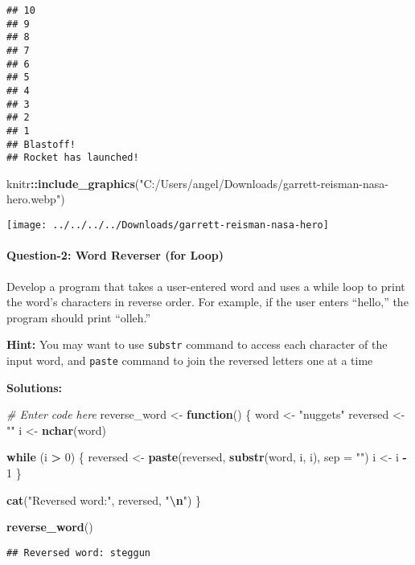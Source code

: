 \documentclass[
]{article}
\newenvironment{Shaded}{\begin{snugshade}}{\end{snugshade}}
\newcommand{\AttributeTok}[1]{\textcolor[rgb]{0.13,0.29,0.53}{#1}}
\newcommand{\CommentTok}[1]{\textcolor[rgb]{0.56,0.35,0.01}{\textit{#1}}}
\newcommand{\ControlFlowTok}[1]{\textcolor[rgb]{0.13,0.29,0.53}{\textbf{#1}}}
\newcommand{\DecValTok}[1]{\textcolor[rgb]{0.00,0.00,0.81}{#1}}
\newcommand{\FunctionTok}[1]{\textcolor[rgb]{0.13,0.29,0.53}{\textbf{#1}}}
\newcommand{\NormalTok}[1]{#1}
\newcommand{\OtherTok}[1]{\textcolor[rgb]{0.56,0.35,0.01}{#1}}
\newcommand{\SpecialCharTok}[1]{\textcolor[rgb]{0.81,0.36,0.00}{\textbf{#1}}}
\newcommand{\StringTok}[1]{\textcolor[rgb]{0.31,0.60,0.02}{#1}}
\begin{document}
\begin{verbatim}
## 10 
## 9 
## 8 
## 7 
## 6 
## 5 
## 4 
## 3 
## 2 
## 1 
## Blastoff!
## Rocket has launched!
\end{verbatim}

\begin{Shaded}
\begin{Highlighting}[]
\NormalTok{knitr}\SpecialCharTok{::}\FunctionTok{include\_graphics}\NormalTok{(}\StringTok{"C:/Users/angel/Downloads/garrett{-}reisman{-}nasa{-}hero.webp"}\NormalTok{)}
\end{Highlighting}
\end{Shaded}

\texttt{[image: ../../../../Downloads/garrett-reisman-nasa-hero]}

\hypertarget{question-2-word-reverser-for-loop}{%
\paragraph{Question-2: Word Reverser (for
Loop)}\label{question-2-word-reverser-for-loop}}

Develop a program that takes a user-entered word and uses a while loop
to print the word's characters in reverse order. For example, if the
user enters ``hello,'' the program should print ``olleh.''

\textbf{Hint:} You may want to use \texttt{substr} command to access
each character of the input word, and \texttt{paste} command to join the
reversed letters one at a time

\textbf{Solutions:}

\begin{Shaded}
\begin{Highlighting}[]
\CommentTok{\# Enter code here}
\NormalTok{reverse\_word }\OtherTok{\textless{}{-}} \ControlFlowTok{function}\NormalTok{() \{}
\NormalTok{  word }\OtherTok{\textless{}{-}} \StringTok{"nuggets"}
\NormalTok{  reversed }\OtherTok{\textless{}{-}} \StringTok{""}
\NormalTok{  i }\OtherTok{\textless{}{-}} \FunctionTok{nchar}\NormalTok{(word)}
  
  \ControlFlowTok{while}\NormalTok{ (i }\SpecialCharTok{\textgreater{}} \DecValTok{0}\NormalTok{) \{}
\NormalTok{    reversed }\OtherTok{\textless{}{-}} \FunctionTok{paste}\NormalTok{(reversed, }\FunctionTok{substr}\NormalTok{(word, i, i), }\AttributeTok{sep =} \StringTok{""}\NormalTok{)}
\NormalTok{    i }\OtherTok{\textless{}{-}}\NormalTok{ i }\SpecialCharTok{{-}} \DecValTok{1}
\NormalTok{  \}}
  
  \FunctionTok{cat}\NormalTok{(}\StringTok{"Reversed word:"}\NormalTok{, reversed, }\StringTok{"}\SpecialCharTok{\textbackslash{}n}\StringTok{"}\NormalTok{)}
\NormalTok{\}}

\FunctionTok{reverse\_word}\NormalTok{()}
\end{Highlighting}
\end{Shaded}

\begin{verbatim}
## Reversed word: steggun
\end{verbatim}
\end{document}
